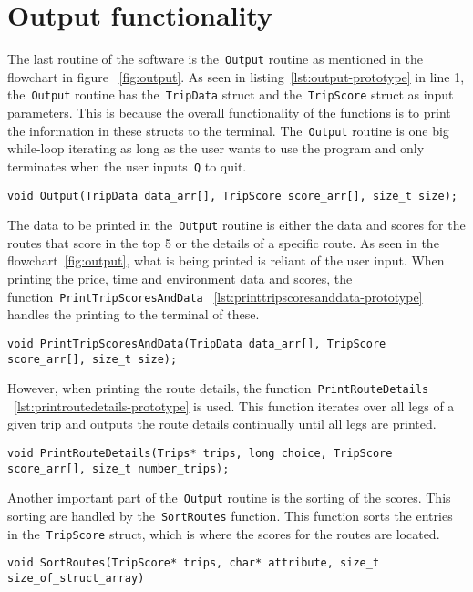 \section{Output functionality}\label{sec:output-functionality}

The last routine of the software is the~\texttt{Output} routine as mentioned in the flowchart in figure
~\ref{fig:output}.
As seen in listing~\ref{lst:output-prototype} in line 1, the~\texttt{Output} routine has the~\texttt{TripData} struct
and the~\texttt{TripScore} struct as input parameters.
This is because the overall functionality of the functions is to print the information in these structs to the terminal.
The~\texttt{Output} routine is one big while-loop iterating as long as the user wants to use the program and only
terminates when the user inputs~\texttt{Q} to quit.

\begin{lstlisting}[caption={Function prototype for~\texttt{Output}}, label={lst:output-prototype}, captionpos=b]
void Output(TripData data_arr[], TripScore score_arr[], size_t size);
\end{lstlisting}

The data to be printed in the~\texttt{Output} routine is either the data and scores for the routes that score in the top
5 or the details of a specific route.
As seen in the flowchart~\ref{fig:output}, what is being printed is reliant of the user input.
When printing the price, time and environment data and scores, the function~\texttt{PrintTripScoresAndData}
~\ref{lst:printtripscoresanddata-prototype} handles the printing to the terminal of these.

\begin{lstlisting}[caption={Function prototype for~\texttt{PrintTripScoresAndData}},
    label={lst:printtripscoresanddata-prototype}, captionpos=b]
void PrintTripScoresAndData(TripData data_arr[], TripScore score_arr[], size_t size);
\end{lstlisting}

However, when printing the route details, the function~\texttt{PrintRouteDetails}
~\ref{lst:printroutedetails-prototype} is used.
This function iterates over all legs of a given trip and outputs the route details continually until all legs are
printed.

\begin{lstlisting}[caption={Function prototype for~\texttt{PrintRouteDetails}},
    label={lst:printroutedetails-prototype}, captionpos=b]
void PrintRouteDetails(Trips* trips, long choice, TripScore score_arr[], size_t number_trips);
\end{lstlisting}

Another important part of the~\texttt{Output} routine is the sorting of the scores.
This sorting are handled by the~\texttt{SortRoutes} function.
This function sorts the entries in the~\texttt{TripScore} struct, which is where the scores for the routes are located.

\begin{lstlisting}[caption={Function prototype for~\texttt{SortRoutes}}, label={lst:sortroutes-prototype},
    captionpos=b]
void SortRoutes(TripScore* trips, char* attribute, size_t size_of_struct_array)
\end{lstlisting}
